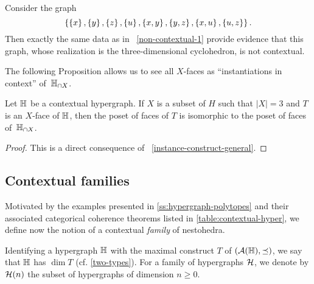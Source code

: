 \begin{example} 
  \label{non-contextual-2}
Consider the graph 
$$\left\{\left\{x\right\},\left\{y\right\},\left\{z\right\},\left\{u\right\},\left\{x,y\right\}, \left\{y,z\right\}, \left\{x,u\right\}, \left\{u,z\right\}\right\}.$$
Then exactly the same data as in~ \cref{non-contextual-1} provide evidence that this graph, whose realization is the three-dimensional cyclohedron, is not contextual. 
\end{example}


The following Proposition allows us to see all $X$-faces as ``instantiations in context'' of~${\mathbb H}_{\cap X}$.

\begin{proposition} \label{situation-construct}
Let ${\mathbb H}$ be a contextual hypergraph.
If $X$ is a subset of $H$ such that $|X|=3$ and $T$ is an $X$-face of ${\mathbb H}$, then the poset of faces of $T$ is isomorphic to the poset of faces of~${\mathbb H}_{\cap X}$.
\end{proposition}

\begin{proof}  This is a direct consequence of~ \cref{instance-construct-general}.
\end{proof}





\subsection{Contextual families}

Motivated by the examples presented in \cref{ss:hypergraph-polytopes}
and their associated categorical coherence theorems listed in \cref{table:contextual-hyper}, we define now the notion of a contextual \emph{family} of nestohedra.

Identifying a hypergraph ${\mathbb H}$ with the maximal construct $T$ of $({\cal A}({\mathbb H}),\preceq)$, we say that ${\mathbb H}$ has  $\dim T$ (cf.  \cref{two-types}).
For a family of hypergraphs $\mathcal{H}$, we denote by $\mathcal{H}(n)$ the subset of hypergraphs of dimension $n \geq 0$.

